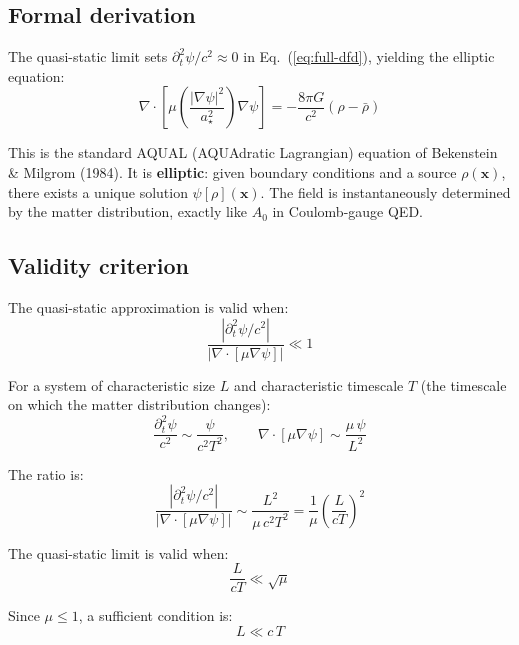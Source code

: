 \documentclass[12pt,a4paper]{article}
\begin{document}
\subsection{Formal derivation}

The quasi-static limit sets $\partial_t^2\psi/c^2 \approx 0$ in
Eq.~(\ref{eq:full-dfd}), yielding the elliptic equation:
\begin{equation}\label{eq:elliptic}
\nabla\cdot\!\left[\mu\!\left(\frac{|\nabla\psi|^2}{a_\star^2}\right)
\nabla\psi\right] = -\frac{8\pi G}{c^2}(\rho - \bar\rho)
\end{equation}

This is the standard AQUAL (AQUAdratic Lagrangian) equation of Bekenstein
\& Milgrom (1984). It is \textbf{elliptic}: given boundary conditions and
a source $\rho(\mathbf{x})$, there exists a unique solution
$\psi[\rho](\mathbf{x})$. The field is instantaneously determined by the
matter distribution, exactly like $A_0$ in Coulomb-gauge QED.

\subsection{Validity criterion}

The quasi-static approximation is valid when:
\begin{equation}\label{eq:qs-criterion}
\boxed{\frac{|\partial_t^2\psi/c^2|}{|\nabla\cdot[\mu\nabla\psi]|} \ll 1}
\end{equation}

For a system of characteristic size $L$ and characteristic timescale $T$
(the timescale on which the matter distribution changes):
\begin{equation}
\frac{\partial_t^2\psi}{c^2} \sim \frac{\psi}{c^2 T^2},
\qquad
\nabla\cdot[\mu\nabla\psi] \sim \frac{\mu\,\psi}{L^2}
\end{equation}

The ratio is:
\begin{equation}\label{eq:qs-ratio}
\frac{|\partial_t^2\psi/c^2|}{|\nabla\cdot[\mu\nabla\psi]|}
\sim \frac{L^2}{\mu\, c^2 T^2}
= \frac{1}{\mu}\left(\frac{L}{cT}\right)^2
\end{equation}

The quasi-static limit is valid when:
\begin{equation}
\frac{L}{cT} \ll \sqrt{\mu}
\end{equation}

Since $\mu \leq 1$, a sufficient condition is:
\begin{equation}\label{eq:qs-sufficient}
\boxed{L \ll c\,T}
\end{equation}
\end{document}
